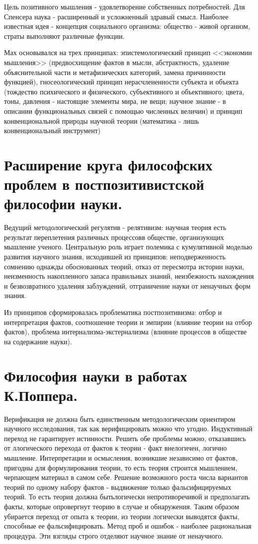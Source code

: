 \documentclass[12pt, specialist, subf, substylefile = spbu.rtx]{disser}
\begin{document}
Цель позитивного мышления - удовлетворение собственных потребностей.
Для Спенсера наука - расширенный и усложненный здравый смысл. Наиболее известная идея - концепция социального организма: общество - живой организм, страты выполняют различные функции.

Мах основывался на трех принципах: эпистемологический принцип <<экономии мышления>> (предвосхищение фактов в мысли, абстрактность, удаление объяснительной части и метафизических категорий, замена причинности функцией), гносеологический принцип нерасчлененности субъекта и объекта (тождество психического и физического, субъективного и объективного; цвета, тоны, давления - настоящие элементы мира, не вещи; научное знание - в описании функциональных связей с помощью численных величин) и принцип конвенциональной природы научной теории (математика - лишь конвенциональный инструмент)

\section{Расширение круга философских проблем в постпозитивистской философии науки.}
Ведущий методологический регулятив - релятивизм: научная теория есть результат переплетения различных процессовв обществе, организующих мышление ученого. Центральную роль играет полемика с кумулятивной моделью развития научного знания, исходившей из принципов: неподверженность сомнению однажды обоснованных теорий, отказ от пересмотра истории науки, неизменность накопленного запаса правильных знаний, неизбежность нахождения и безвозвратного удаления заблуждений, отграничение науки от ненаучных форм знания.

Из принципов сформировалась проблематика постпозитивизма: отбор и интерпретация фактов, соотношение теории и эмпирии (влияние теории на отбор фактов), проблема интернализма-экстернализма (влияние процессов в обществе на содержание науки).


\section{Философия науки в работах К.Поппера.}
Верификация не должна быть единственным методологическим ориентиром научного исследования, так как верифицировать можно что угодно. Индуктивный переход не гарантирует истинности. Решить обе проблемы можно, отказавшись от ллогического перехода от фактов к теории - факт внелогичен, логично мышление. Интерпретации и осмысления, возникшие независимо от фактов, пригодны для формулирования теории, то есть теория строится мышлением, черпающем материал в самом себе. Решение возможного роста числа вариантов теорий по одному набору фактов - выдвижение только фальсифицируемых теорий. То есть теория должна бытьлогически непротиворечивой и предполагать факты, которые опровергнут теорию в случае и обнаружения. Таким образом убирается переход от опыта к теории, из теории логически выводятся факты, способные ее фальсифицировать. Метод проб и ошибок - наиболее рациональная процедура. Эти взгляды строго отделяют научное знание от ненаучного.
\end{document}
